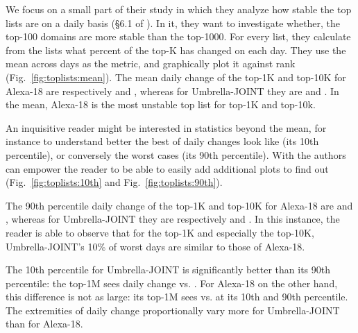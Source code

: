 We focus on a small part of their study in which they analyze how stable the top lists are on a daily basis (\S6.1 of \cite{top-lists}). In it, they want to investigate whether, \eg the top-100 domains are more stable than the top-1000. For every list, they calculate from the lists what percent of the top-K has changed on each day. They use the mean across days as the metric, and graphically plot it against rank (Fig.~\ref{fig:toplists:mean}). The mean daily change of the top-1K and top-10K for Alexa-18 are respectively  and , whereas for Umbrella-JOINT they are  and . In the mean, Alexa-18 is the most unstable top list for top-1K and top-10k.

An inquisitive reader might be interested in statistics beyond the mean, for instance to understand better the best of daily changes look like (\eg its 10th percentile), or conversely the worst cases (\eg its 90th percentile). With \sysname the authors can empower the reader to be able to easily add additional plots to find out (Fig.~\ref{fig:toplists:10th} and Fig.~\ref{fig:toplists:90th}).

 The 90th percentile daily change of the top-1K and top-10K for Alexa-18 are  and , whereas for Umbrella-JOINT they are respectively  and . In this instance, the reader is able to observe that for the top-1K and especially the top-10K, Umbrella-JOINT's 10\% of worst days are similar to those of Alexa-18.

 The 10th percentile for Umbrella-JOINT is significantly better than its 90th percentile: the top-1M sees  daily change vs. . For Alexa-18 on the other hand, this difference is not as large: its top-1M sees  vs.  at its 10th and 90th percentile. The extremities of daily change proportionally vary more for Umbrella-JOINT than for Alexa-18.

